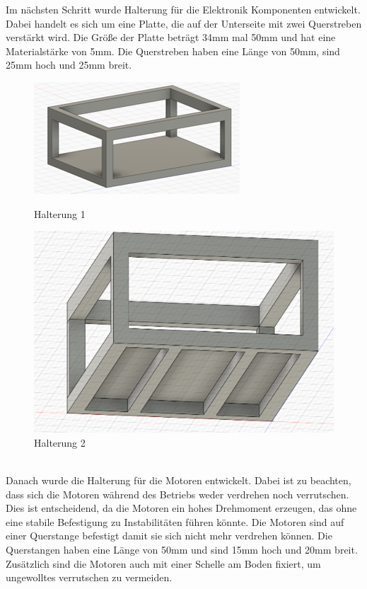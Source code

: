 \documentclass[ngerman,12pt,a4paper]{article}
\begin{document}
		Im nächsten Schritt wurde Halterung für die Elektronik Komponenten entwickelt. Dabei handelt es sich um eine Platte, die auf der Unterseite mit zwei Querstreben verstärkt wird. Die Größe der Platte beträgt 34mm mal 50mm und hat eine Materialstärke von 5mm. Die Querstreben haben eine Länge von 50mm, sind 25mm hoch und 25mm breit. \\
		\begin{figure}[h]
			\begin{minipage}{0.3\linewidth}
				\centering
				\includegraphics{Pictures/Halterung-1}
				\caption{Halterung 1}
				\label{fig:Halterung-1}
			\end{minipage}
			\hspace{0.25\linewidth}
			\begin{minipage}{0.3\linewidth}
				\centering
				\includegraphics{Pictures/Halterung-2}
				\caption{Halterung 2}
				\label{fig:Halterung-2}
			\end{minipage}
		\end{figure} \\
		Danach wurde die Halterung für die Motoren entwickelt. Dabei ist zu beachten, dass sich die Motoren während des Betriebs weder verdrehen noch verrutschen. Dies ist entscheidend, da die Motoren ein hohes Drehmoment erzeugen, das ohne eine stabile Befestigung zu Instabilitäten führen könnte. Die Motoren sind auf einer Querstange befestigt damit sie sich nicht mehr verdrehen können. Die Querstangen haben eine Länge von 50mm und sind 15mm hoch und 20mm breit. Zusätzlich sind die Motoren auch mit einer Schelle am Boden fixiert, um ungewolltes verrutschen zu vermeiden. \\
\end{document}
